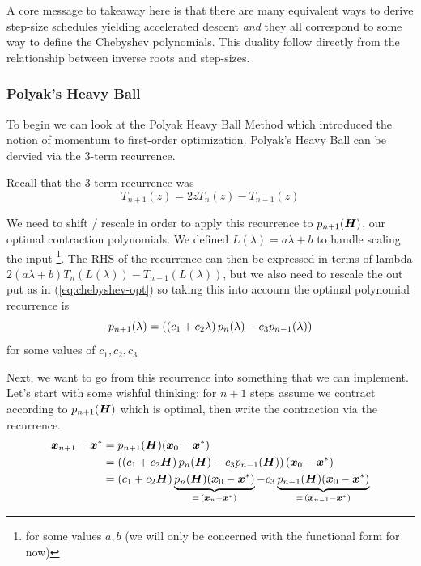 \documentclass[11pt]{article}
\begin{document}
A core message to takeaway here is that there are many equivalent ways to derive step-size schedules yielding accelerated descent \textit{and} they all correspond to some way to define the Chebyshev polynomials. This duality follow directly from the relationship between inverse roots and step-sizes. 

\subsubsection{Polyak's Heavy Ball}

To begin we can look at the Polyak Heavy Ball Method which introduced the notion of momentum to first-order optimization. Polyak's Heavy Ball can be dervied via the 3-term recurrence. 

Recall that the 3-term recurrence was 
\[T_{n+1}(z)=2zT_n(z) - T_{n-1}(z)\]

We need to shift / rescale in order to apply this recurrence to $p_{n+1}(\bm{H})$, our optimal contraction polynomials. We defined $L(\lambda) = a \lambda + b$ to handle scaling the input \footnote{for some values $a, b$ (we will only be concerned with the functional form for now)}. The RHS of the recurrence can then be expressed in terms of lambda $2(a\lambda + b)T_n(L(\lambda)) - T_{n-1}(L(\lambda))$, but we also need to rescale the out put as in (\ref{eq:chebyshev-opt}) so taking this into accourn the optimal polynomial recurrence is 
\[p_{n+1}(\lambda) = \left(\left(c_1+c_2\lambda\right)p_{n}(\lambda) - c_3 p_{n-1}(\lambda)\right)\]
for some values of $c_1, c_2, c_3$


Next, we want to go from this recurrence into something that we can implement. Let's start with some wishful thinking: for $n+1$ steps assume we contract according to $p_{n+1}(\bm{H})$ which is optimal, then write the contraction via the recurrence.
\begin{align*}
\bm{x}_{n+1} - \bm{x}^* &= p_{n+1}(\bm{H})(\bm{x}_0-\bm{x}^*) \\
&= \left(\left(c_1+c_2\bm{H}\right)p_{n}(\bm{H}) - c_3 p_{n-1}(\bm{H})\right)(\bm{x}_0-\bm{x}^*) \\
&= \left(c_1+c_2\bm{H}\right)\underbrace{p_{n}(\bm{H})(\bm{x}_0-\bm{x}^*)}_{=\, \left(\bm{x}_n - \bm{x}^*\right)} - c_3\underbrace{p_{n-1}(\bm{H})(\bm{x}_0-\bm{x}^*)}_{=\, \left(\bm{x}_{n-1} - \bm{x}^*\right)}
\end{align*}
\end{document}
